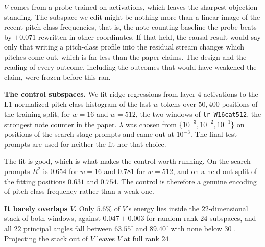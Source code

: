 \documentclass{article}
\begin{document}
%
$V$ comes from a probe trained on activations, which leaves the sharpest objection
standing. The subspace we edit might be nothing more than a linear image of the recent
pitch-class frequencies, that is, the note-counting baseline the probe beats by
$+0.071$ rewritten in other coordinates. If that held, the causal result would say only
that writing a pitch-class profile into the residual stream changes which pitches come
out, which is far less than the paper claims. The design and the reading of every
outcome, including the outcomes that would have weakened the claim, were frozen before
this ran.

\textbf{The control subspaces.} We fit ridge regressions from layer-$4$ activations to
the L1-normalized pitch-class histogram of the last $w$ tokens over $50{,}400$ positions
of the training split, for $w=16$ and $w=512$, the two windows of
\texttt{lr\_W16cat512}, the strongest note counter in the paper. $\lambda$ was chosen
from $\{10^{-3},10^{-2},10^{-1}\}$ on positions of the search-stage prompts and came out
at $10^{-3}$. The final-test prompts are used for neither the fit nor that choice.

The fit is good, which is what makes the control worth running. On the search prompts
$R^2$ is $0.654$ for $w=16$ and $0.781$ for $w=512$, and on a held-out split of the
fitting positions $0.631$ and $0.754$. The control is therefore a genuine encoding of
pitch-class frequency rather than a weak one.

\textbf{It barely overlaps $V$.} Only $5.6\%$ of $V$'s energy lies inside the
$22$-dimensional stack of both windows, against $0.047 \pm 0.003$ for random rank-$24$
subspaces, and all $22$ principal angles fall between $63.55^\circ$ and $89.40^\circ$
with none below $30^\circ$. Projecting the stack out of $V$ leaves $V$ at full rank $24$.
\end{document}
